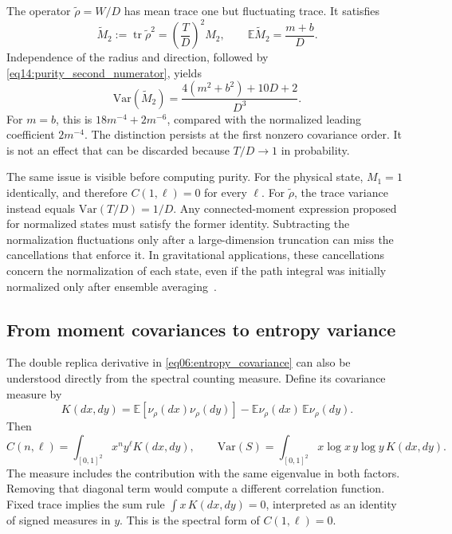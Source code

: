 \documentclass[11pt,letterpaper]{article}
\theoremstyle{plain}
\theoremstyle{definition}
\theoremstyle{remark}
\newcommand{\E}{\mathbb{E}}
\newcommand{\Var}{\text{Var}}
\DeclareMathOperator{\tr}{tr}
\begin{document}
The operator $\widetilde\rho=W/D$ has mean trace one but fluctuating
trace.  It satisfies
\begin{equation}
 \widetilde M_2:=\tr\widetilde\rho^2
 =\left(\frac{T}{D}\right)^2M_2,\qquad
 \E\widetilde M_2=\frac{m+b}{D}.
 \label{eq14:unnormalized_purity}
\end{equation}
Independence of the radius and direction, followed by
\eqref{eq14:purity_second_numerator}, yields
\begin{equation}
 \Var(\widetilde M_2)
 =\frac{4(m^2+b^2)+10D+2}{D^3}.
 \label{eq14:unnormalized_variance}
\end{equation}
For $m=b$, this is $18m^{-4}+2m^{-6}$, compared with the normalized
leading coefficient $2m^{-4}$.  The distinction persists at the first
nonzero covariance order.  It is not an effect that can be discarded
because $T/D\to1$ in probability.

The same issue is visible before computing purity.  For the physical
state, $M_1=1$ identically, and therefore $C(1,\ell)=0$ for every
$\ell$.  For $\widetilde\rho$, the trace variance instead equals
$\Var(T/D)=1/D$.  Any connected-moment expression proposed for
normalized states must satisfy the former identity.  Subtracting the
normalization fluctuations only after a large-dimension truncation can
miss the cancellations that enforce it.  In gravitational applications,
these cancellations concern the normalization of each state, even if
the path integral was initially normalized only after ensemble
averaging~\citep{boussomiyaji2024}.

\subsection{From moment covariances to entropy variance}
\label{subsec14:entropy_variance}

The double replica derivative in
\eqref{eq06:entropy_covariance} can also be understood directly from
the spectral counting measure.  Define its covariance measure by
\begin{equation}
 K(dx,dy)=\E[\nu_\rho(dx)\nu_\rho(dy)]
           -\E\nu_\rho(dx)\,\E\nu_\rho(dy).
 \label{eq14:spectral_covariance}
\end{equation}
Then
\begin{equation}
 C(n,\ell)=\int_{[0,1]^2}x^ny^\ell K(dx,dy),\qquad
 \Var(S)=\int_{[0,1]^2}x\log x\,y\log y\,K(dx,dy).
 \label{eq14:spectral_entropy_variance}
\end{equation}
The measure includes the contribution with the same eigenvalue in both
factors.  Removing that diagonal term would compute a different
correlation function.  Fixed trace implies the sum rule
$\int x\,K(dx,dy)=0$, interpreted as an identity of signed measures in
$y$.  This is the spectral form of $C(1,\ell)=0$.
\end{document}
